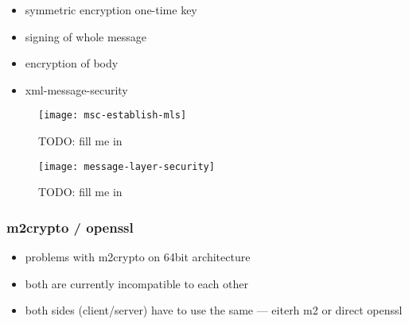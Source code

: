 \begin{itemize}
\item symmetric encryption one-time key
\item signing of whole message
\item encryption of body
\item xml-message-security
\end{itemize}

\begin{figure}[ht]
  \centering
  \texttt{[image: msc-establish-mls]}
  \caption[MSC Message Layer Security]{TODO: fill me in}
  \label{fig:msc-establish-mls}
\end{figure}


\begin{figure}[ht]
  \centering
  \texttt{[image: message-layer-security]}
  \caption[Message Layer Security]{TODO: fill me in}
  \label{fig:net-mls}
\end{figure}

\subsubsection{m2crypto / openssl}

\begin{itemize}
\item problems with m2crypto on 64bit architecture
\item both are currently incompatible to each other
\item both sides (client/server) have to use the same --- eiterh m2 or
  direct openssl
\end{itemize}


